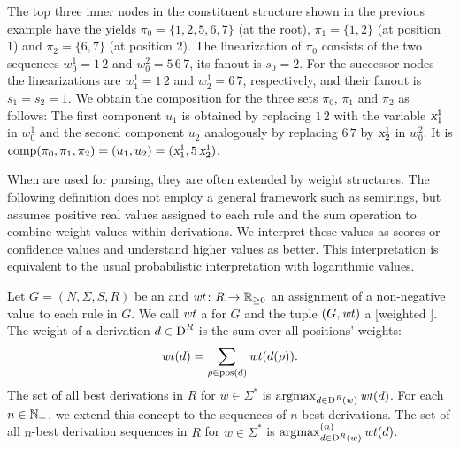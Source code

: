\documentclass[../../document.tex]{subfiles}
\begin{document}
    \begin{example}
        The top three inner nodes in the constituent structure shown in the previous example have the yields \(\pi_0 = \{1,2,5,6,7\}\) (at the root), \(\pi_1 = \{1,2\}\) (at position 1) and \(\pi_2 = \{6,7\}\) (at position 2).
        The linearization of \(\pi_0\) consists of the two sequences \(w_0^1 = 1\,2\) and \(w_0^2 = 5\,6\,7\), its fanout is \(s_0=2\).
        For the successor nodes the linearizations are \(w_1^1 = 1\,2\) and \(w_2^1 = 6\,7\), respectively, and their fanout is \(s_1 = s_2 = 1\).
        We obtain the composition for the three sets \(\pi_0\), \(\pi_1\) and \(\pi_2\) as follows:
            The first component \(u_1\) is obtained by replacing \(1\,2\) with the variable \(\textsl{x}_1^1\) in \(w_0^1\) and the second component \(u_2\) analogously by replacing \(6\,7\) by \(\textsl{x}_2^1\) in \(w_0^2\).
        It is \(\mathrm{comp}(\pi_0, \pi_1, \pi_2) = (u_1, u_2) = (\textsl{x}_1^1, 5\,\textsl{x}_2^1)\).
    \end{example}

    When  are used for parsing, they are often extended by weight structures.
    The following definition does not employ a general framework such as semirings, but assumes positive real values assigned to each rule and the sum operation to combine weight values within derivations.
    We interpret these values as scores or confidence values and understand higher values as better.
    This interpretation is equivalent to the usual probabilistic interpretation \citep[cf.][Viterbi semiring]{Goodman} with logarithmic values.

    \begin{definition}
        Let \(G = (N, \varSigma, S, R)\) be an  and \(\mathit{wt} \colon R \to \mathbb{R}_{\ge 0}\) an assignment of a non-negative value to each rule in \(G\).
        We call \(\mathit{wt}\) a  for \(G\) and the tuple \((G, \mathit{wt})\) a [weighted ].
        The weight of a derivation \(d \in \operatorname{D}^R\) is the sum over all positions' weights: \[ \mathit{wt}(d) = \sum_{\rho \in \operatorname{pos}(d)} \mathit{wt}(d(\rho))\text{.} \]
        The set of all best derivations in \(R\) for \(w \in \varSigma^*\) is \(\operatorname{arg max}_{d \in \operatorname{D}^R(w)} \mathit{wt}(d)\).
        For each \(n\in \mathbb{N}_+\), we extend this concept to the sequences of \(n\)-best derivations.
        The set of all \(n\)-best derivation sequences in \(R\) for \(w \in \varSigma^*\) is \(\operatorname{arg max}^{(n)}_{d \in \operatorname{D}^R(w)} \mathit{wt}(d)\).
    \end{definition}
\end{document}
